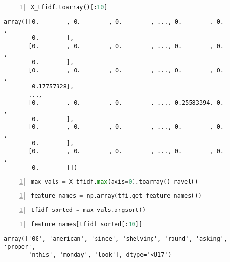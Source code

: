 \documentclass[10pt,parskip=half,
	toc=sectionentrywithdots,
	bibliography=totocnumbered,
	captions=tableheading,numbers=noendperiod]{scrartcl}
\begin{document}
\begin{lstlisting}[language=Python,numbers=left,xleftmargin=20pt,xrightmargin=5pt,belowskip=5pt,aboveskip=5pt]
X_tfidf.toarray()[:10]
\end{lstlisting}

\begin{lstlisting}[language={},postbreak={},numbers=none,xrightmargin=7pt,breakindent=0pt,aboveskip=5pt,belowskip=5pt]
array([[0.        , 0.        , 0.        , ..., 0.        , 0.        ,
        0.        ],
       [0.        , 0.        , 0.        , ..., 0.        , 0.        ,
        0.        ],
       [0.        , 0.        , 0.        , ..., 0.        , 0.        ,
        0.17757928],
       ...,
       [0.        , 0.        , 0.        , ..., 0.25583394, 0.        ,
        0.        ],
       [0.        , 0.        , 0.        , ..., 0.        , 0.        ,
        0.        ],
       [0.        , 0.        , 0.        , ..., 0.        , 0.        ,
        0.        ]])
\end{lstlisting}

\begin{lstlisting}[language=Python,numbers=left,xleftmargin=20pt,xrightmargin=5pt,belowskip=5pt,aboveskip=5pt]
max_vals = X_tfidf.max(axis=0).toarray().ravel()
\end{lstlisting}

\begin{lstlisting}[language=Python,numbers=left,xleftmargin=20pt,xrightmargin=5pt,belowskip=5pt,aboveskip=5pt]
feature_names = np.array(tfi.get_feature_names())
\end{lstlisting}

\begin{lstlisting}[language=Python,numbers=left,xleftmargin=20pt,xrightmargin=5pt,belowskip=5pt,aboveskip=5pt]
tfidf_sorted = max_vals.argsort()
\end{lstlisting}

\begin{lstlisting}[language=Python,numbers=left,xleftmargin=20pt,xrightmargin=5pt,belowskip=5pt,aboveskip=5pt]
feature_names[tfidf_sorted[:10]]
\end{lstlisting}

\begin{lstlisting}[language={},postbreak={},numbers=none,xrightmargin=7pt,breakindent=0pt,aboveskip=5pt,belowskip=5pt]
array(['00', 'american', 'since', 'shelving', 'round', 'asking', 'proper',
       'nthis', 'monday', 'look'], dtype='<U17')
\end{lstlisting}
\end{document}

